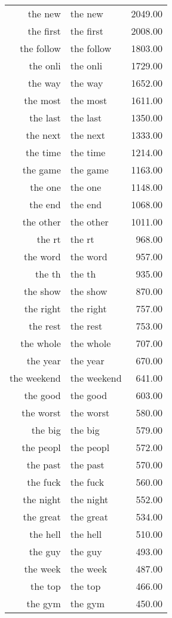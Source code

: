 \begin{table}[ht]
\begin{tabular}{rlr}
  the new & the new & 2049.00 \\ 
  the first & the first & 2008.00 \\ 
  the follow & the follow & 1803.00 \\ 
  the onli & the onli & 1729.00 \\ 
  the way & the way & 1652.00 \\ 
  the most & the most & 1611.00 \\ 
  the last & the last & 1350.00 \\ 
  the next & the next & 1333.00 \\ 
  the time & the time & 1214.00 \\ 
  the game & the game & 1163.00 \\ 
  the one & the one & 1148.00 \\ 
  the end & the end & 1068.00 \\ 
  the other & the other & 1011.00 \\ 
  the rt & the rt & 968.00 \\ 
  the word & the word & 957.00 \\ 
  the th & the th & 935.00 \\ 
  the show & the show & 870.00 \\ 
  the right & the right & 757.00 \\ 
  the rest & the rest & 753.00 \\ 
  the whole & the whole & 707.00 \\ 
  the year & the year & 670.00 \\ 
  the weekend & the weekend & 641.00 \\ 
  the good & the good & 603.00 \\ 
  the worst & the worst & 580.00 \\ 
  the big & the big & 579.00 \\ 
  the peopl & the peopl & 572.00 \\ 
  the past & the past & 570.00 \\ 
  the fuck & the fuck & 560.00 \\ 
  the night & the night & 552.00 \\ 
  the great & the great & 534.00 \\ 
  the hell & the hell & 510.00 \\ 
  the guy & the guy & 493.00 \\ 
  the week & the week & 487.00 \\ 
  the top & the top & 466.00 \\ 
  the gym & the gym & 450.00 \\ 

\end{tabular}
\end{table}
